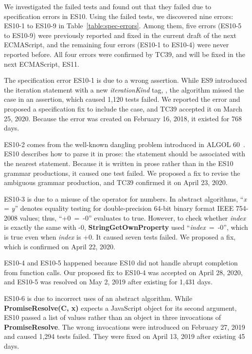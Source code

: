 We investigated the failed tests and found out that they failed due to
specification errors in ES10.  Using the failed tests, we
discovered nine errors: ES10-1 to ES10-9 in
Table~\ref{table:spec-errors}.  Among them, five errors (ES10-5 to
ES10-9) were previously reported and fixed in the current draft of the
next ECMAScript, and the remaining four errors (ES10-1 to ES10-4) were
never reported before.  All four errors were confirmed by TC39, and
will be fixed in the next ECMAScript, ES11.

The specification error ES10-1 is due to a wrong assertion.
While ES9 introduced the  iteration statement with a
new {\it iterationKind} tag, , the
 algorithm missed the
 case in an assertion, which caused 1,120
tests failed.  We reported the error and proposed a specification fix
to include  the  case, and TC39 accepted it on
March 25, 2020.  Because the error was created on February 16, 2018,
it existed for 768 days.

ES10-2 comes from the well-known dangling  problem
introduced in ALGOL 60~\cite{dangling-else}.  ES10 describes how to
parse it in prose: the  statement should be associated with
the nearest  statement.  Because it is written in prose
rather than in the ES10 grammar productions, it caused one test
failed.  We proposed a fix to revise the ambiguous grammar production,
and TC39 confirmed it on April 23, 2020.

ES10-3 is due to a misuse of the \code{=} operator for numbers.
In abstract algorithms, ``{\it x} = {\it y}'' denotes equality testing
for double-precision 64-bit binary format IEEE 754-2008 values;
thus, \mbox{``+0 = -0''} evaluates to true.  However, to check whether
{\it index} is exactly the same with -0,
{\bf StringGetOwnProperty} used \mbox{``{\it index} = -0''},
which is true even when {\it index} is +0.
It caused seven tests failed.  We proposed a fix, which is
confirmed on April 22, 2020.

ES10-4 and ES10-5 happened because ES10 did not handle
abrupt completion from function calls.  Our proposed fix to ES10-4 was
accepted on April 28, 2020, and ES10-5 was resolved on May 2, 2019
after existing for 1,431 days.

ES10-6 is due to incorrect uses of an abstract algorithm.
While {\bf PromiseResolve(C, x)} expects a JavaScript object for its
second argument, ES10 passed a list of values rather than an object in
three invocations of {\bf PromiseResolve}.  The wrong invocations were
introduced on February 27, 2019 and caused 1,294 tests failed.
They were fixed on April 13, 2019 after existing 45 days.

